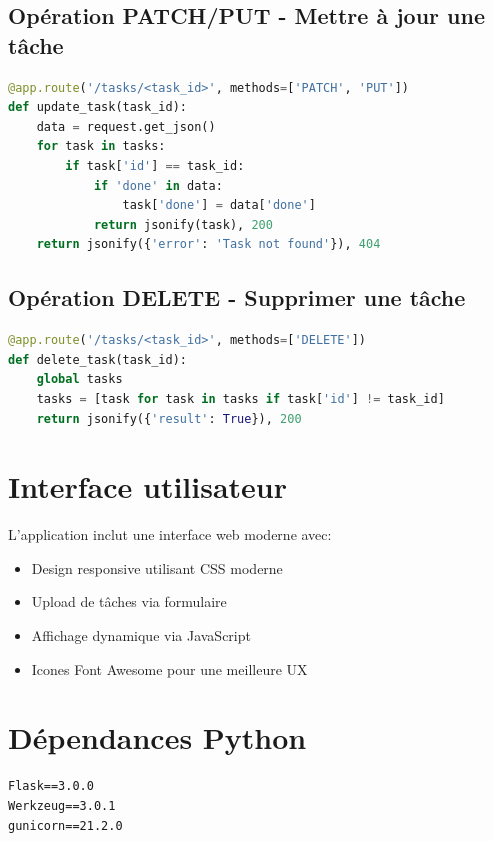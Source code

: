 \documentclass[12pt,a4paper,twoside]{report}
\begin{document}
\subsection{Opération PATCH/PUT - Mettre à jour une tâche}

\begin{lstlisting}[language=Python]
@app.route('/tasks/<task_id>', methods=['PATCH', 'PUT'])
def update_task(task_id):
    data = request.get_json()
    for task in tasks:
        if task['id'] == task_id:
            if 'done' in data:
                task['done'] = data['done']
            return jsonify(task), 200
    return jsonify({'error': 'Task not found'}), 404
\end{lstlisting}

\subsection{Opération DELETE - Supprimer une tâche}

\begin{lstlisting}[language=Python]
@app.route('/tasks/<task_id>', methods=['DELETE'])
def delete_task(task_id):
    global tasks
    tasks = [task for task in tasks if task['id'] != task_id]
    return jsonify({'result': True}), 200
\end{lstlisting}

\section{Interface utilisateur}

L'application inclut une interface web moderne avec:
\begin{itemize}
    \item Design responsive utilisant CSS moderne
    \item Upload de tâches via formulaire
    \item Affichage dynamique via JavaScript
    \item Icones Font Awesome pour une meilleure UX
\end{itemize}

\section{Dépendances Python}

\begin{lstlisting}
Flask==3.0.0
Werkzeug==3.0.1
gunicorn==21.2.0
\end{lstlisting}
\end{document}
